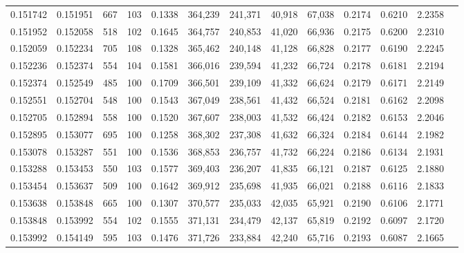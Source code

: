 \begin{tabular}{rrrrrrrrrrrrr}
0.151742 & 0.151951 &   667 & 103 &                                     0.1338 & 364,239 & 241,371 &  40,918 &  67,038 & 0.2174 & 0.6210 & 2.2358 \\
0.151952 & 0.152058 &   518 & 102 &                                     0.1645 & 364,757 & 240,853 &  41,020 &  66,936 & 0.2175 & 0.6200 & 2.2310 \\
0.152059 & 0.152234 &   705 & 108 &                                     0.1328 & 365,462 & 240,148 &  41,128 &  66,828 & 0.2177 & 0.6190 & 2.2245 \\
0.152236 & 0.152374 &   554 & 104 &                                     0.1581 & 366,016 & 239,594 &  41,232 &  66,724 & 0.2178 & 0.6181 & 2.2194 \\
0.152374 & 0.152549 &   485 & 100 &                                     0.1709 & 366,501 & 239,109 &  41,332 &  66,624 & 0.2179 & 0.6171 & 2.2149 \\
0.152551 & 0.152704 &   548 & 100 &                                     0.1543 & 367,049 & 238,561 &  41,432 &  66,524 & 0.2181 & 0.6162 & 2.2098 \\
0.152705 & 0.152894 &   558 & 100 &                                     0.1520 & 367,607 & 238,003 &  41,532 &  66,424 & 0.2182 & 0.6153 & 2.2046 \\
0.152895 & 0.153077 &   695 & 100 &                                     0.1258 & 368,302 & 237,308 &  41,632 &  66,324 & 0.2184 & 0.6144 & 2.1982 \\
0.153078 & 0.153287 &   551 & 100 &                                     0.1536 & 368,853 & 236,757 &  41,732 &  66,224 & 0.2186 & 0.6134 & 2.1931 \\
0.153288 & 0.153453 &   550 & 103 &                                     0.1577 & 369,403 & 236,207 &  41,835 &  66,121 & 0.2187 & 0.6125 & 2.1880 \\
0.153454 & 0.153637 &   509 & 100 &                                     0.1642 & 369,912 & 235,698 &  41,935 &  66,021 & 0.2188 & 0.6116 & 2.1833 \\
0.153638 & 0.153848 &   665 & 100 &                                     0.1307 & 370,577 & 235,033 &  42,035 &  65,921 & 0.2190 & 0.6106 & 2.1771 \\
0.153848 & 0.153992 &   554 & 102 &                                     0.1555 & 371,131 & 234,479 &  42,137 &  65,819 & 0.2192 & 0.6097 & 2.1720 \\
0.153992 & 0.154149 &   595 & 103 &                                     0.1476 & 371,726 & 233,884 &  42,240 &  65,716 & 0.2193 & 0.6087 & 2.1665 \\

\end{tabular}
